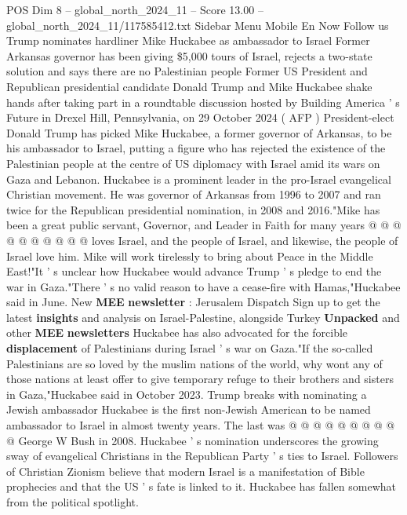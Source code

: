 \begin{textsample}{POS Dim 8 – global\_north\_2024\_11 – Score 13.00 – global\_north\_2024\_11/117585412.txt}  \label{ex:f8_pos_056}
Sidebar Menu Mobile En Now Follow us Trump nominates hardliner Mike Huckabee as ambassador to Israel Former Arkansas governor has been giving \$5,000 tours of Israel, rejects a two-state solution and says there are no Palestinian people Former US President and Republican presidential candidate Donald Trump and Mike Huckabee shake hands after taking part in a roundtable discussion hosted by Building America ' s Future in Drexel Hill, Pennsylvania, on 29 October 2024 ( AFP ) President-elect Donald Trump has picked Mike Huckabee, a former governor of Arkansas, to be his ambassador to Israel, putting a figure who has rejected the existence of the Palestinian people at the centre of US diplomacy with Israel amid its wars on Gaza and Lebanon.
Huckabee is a prominent leader in the pro-Israel evangelical Christian movement.
He was governor of Arkansas from 1996 to 2007 and ran twice for the Republican presidential nomination, in 2008 and 2016."Mike has been a great public servant, Governor, and Leader in Faith for many years @ @ @ @ @ @ @ @ @ @ loves Israel, and the people of Israel, and likewise, the people of Israel love him.
Mike will work tirelessly to bring about Peace in the Middle East!"It ' s unclear how Huckabee would advance Trump ' s pledge to end the war in Gaza."There ' s no valid reason to have a cease-fire with Hamas,"Huckabee said in June.
New \textbf{MEE} \textbf{newsletter} : Jerusalem Dispatch Sign up to get the latest \textbf{insights} and analysis on Israel-Palestine, alongside Turkey \textbf{Unpacked} and other \textbf{MEE} \textbf{newsletters} Huckabee has also advocated for the forcible \textbf{displacement} of Palestinians during Israel ' s war on Gaza."If the so-called Palestinians are so loved by the muslim nations of the world, why wont any of those nations at least offer to give temporary refuge to their brothers and sisters in Gaza,"Huckabee said in October 2023.
Trump breaks with nominating a Jewish ambassador Huckabee is the first non-Jewish American to be named ambassador to Israel in almost twenty years.
The last was @ @ @ @ @ @ @ @ @ @ George W Bush in 2008.
Huckabee ' s nomination underscores the growing sway of evangelical Christians in the Republican Party ' s ties to Israel.
Followers of Christian Zionism believe that modern Israel is a manifestation of Bible prophecies and that the US ' s fate is linked to it.
Huckabee has fallen somewhat from the political spotlight.

\end{textsample}
